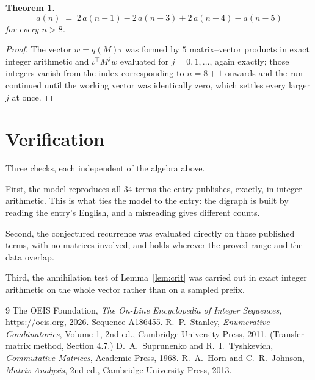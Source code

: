 \documentclass[11pt,a4paper]{article}
\theoremstyle{plain}
\newtheorem{theorem}{Theorem}
\theoremstyle{definition}
\begin{document}
\begin{theorem}
\[
a(n)\;=\;2\,a(n-1) - 2\,a(n-3) + 2\,a(n-4) - a(n-5)
\]
for every $n>8$.
\end{theorem}

\begin{proof}
The vector $w=q(M)\tau$ was formed by $5$ matrix--vector products in exact integer
arithmetic and $\iota^{\!\top}M^{j}w$ evaluated for $j=0,1,\dots$, again exactly; those
integers vanish from the index corresponding to $n=8+1$ onwards and the run continued
until the working vector was identically zero, which settles every larger $j$ at once.
\end{proof}

\section{Verification}

Three checks, each independent of the algebra above.

First, the model reproduces all $34$ terms the entry publishes, exactly, in integer
arithmetic. This is what ties the model to the entry: the digraph is built by reading the
entry's English, and a misreading gives different counts.

Second, the conjectured recurrence was evaluated directly on those published terms, with no
matrices involved, and holds wherever the proved range and the data overlap.

Third, the annihilation test of Lemma~\ref{lem:crit} was carried out in exact integer
arithmetic on the whole vector rather than on a sampled prefix.

\begin{thebibliography}{9}
 The OEIS Foundation, \emph{The On-Line Encyclopedia of Integer
Sequences}, \url{https://oeis.org}, 2026. Sequence A186455.
 R.~P.~Stanley, \emph{Enumerative Combinatorics}, Volume 1, 2nd ed.,
Cambridge University Press, 2011. (Transfer-matrix method, Section 4.7.)
 D.~A.~Suprunenko and R.~I.~Tyshkevich, \emph{Commutative Matrices},
Academic Press, 1968.
 R.~A.~Horn and C.~R.~Johnson, \emph{Matrix Analysis}, 2nd ed., Cambridge
University Press, 2013.
\end{thebibliography}
\end{document}
